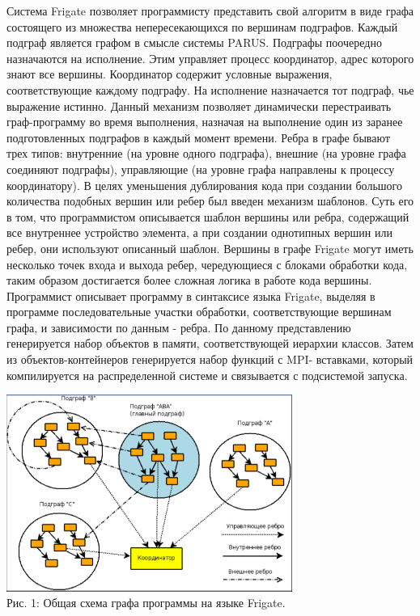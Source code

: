 \documentclass[a4paper, 12pt]{article}
\begin{document}
	Система Frigate позволяет программисту представить свой алгоритм в виде графа состоящего из множества непересекающихся по вершинам подграфов. Каждый подграф является графом в смысле системы PARUS. Подграфы поочередно назначаются на исполнение. Этим управляет процесс координатор, адрес которого знают все вершины. Координатор содержит условные выражения, соответствующие каждому подграфу. На исполнение назначается тот подграф, чье выражение истинно. Данный механизм позволяет динамически перестраивать граф-программу во время выполнения, назначая на выполнение один из заранее подготовленных подграфов в каждый момент времени.
	Ребра в графе бывают трех типов: внутренние (на уровне одного подграфа), внешние (на уровне графа соединяют подграфы), управляющие (на уровне графа направлены к процессу координатору). В целях уменьшения дублирования кода при создании большого количества подобных вершин или ребер был введен механизм шаблонов. Суть его в том, что программистом описывается шаблон вершины или ребра, содержащий все внутреннее устройство элемента, а при создании однотипных вершин или ребер, они используют описанный шаблон.
	Вершины в графе Frigate могут иметь несколько точек входа и выхода ребер, чередующиеся с блоками обработки кода, таким образом достигается более сложная логика в работе кода вершины.
	Программист описывает программу в синтаксисе языка Frigate, выделяя в программе последовательные участки обработки, соответствующие вершинам графа, и зависимости по данным - ребра. По данному представлению генерируется набор объектов в памяти, соответствующей иерархии классов. Затем из объектов-контейнеров генерируется набор функций с MPI- вставками, который компилируется на распределенной системе и связывается с подсистемой запуска.
	
	\begin{center}
		\includegraphics[width=0.7\textwidth]{pic_1.png}\\
		Рис. 1: Общая схема графа программы на языке Frigate. \label{pic_3}
	\end{center}
	
\end{document}
